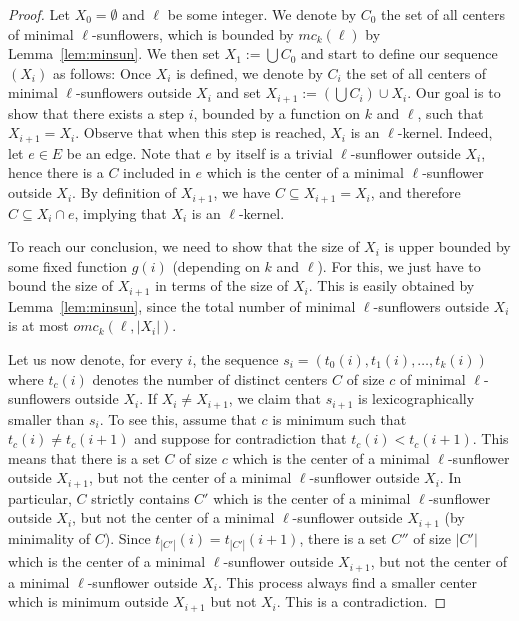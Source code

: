 \documentclass{article}
\newcommand{\hedge}{edge\xspace}
\begin{document}
\begin{proof}
Let $X_0=\emptyset$ and $\ell$ be some integer. We denote by $C_0$ the set of all centers of minimal $\ell$-sunflowers, which is bounded by $mc_k(\ell)$ by Lemma~\ref{lem:minsun}. We then set $X_1:=\bigcup C_0$ and start to define our sequence $(X_i)$ as follows: Once $X_i$ is defined, we denote by $C_i$ the set of all centers of minimal $\ell$-sunflowers outside $X_i$ and set 
$X_{i+1}:=(\bigcup C_i)\cup X_i$. Our goal is to show that there exists a step $i$, bounded by a function on $k$ and $\ell$, such that $X_{i+1}=X_i$. Observe that when this step is reached, $X_i$ is an $\ell$-kernel. Indeed, let $e\in E$ be an \hedge. Note that $e$ by itself is a trivial $\ell$-sunflower outside $X_i$, hence there is a $C$ included in $e$ which is the center of a minimal $\ell$-sunflower outside $X_i$. By definition of $X_{i+1}$, we have $C\subseteq X_{i+1}=X_i$, and therefore $C\subseteq X_i\cap e$, implying that $X_i$ is an \(\ell\)-kernel.

To reach our conclusion, we need to show that the size of $X_i$ is upper bounded by some fixed function $g(i)$ (depending on $k$ and $\ell$). For this, we just have to bound the size of $X_{i+1}$ in terms of the size of $X_i$. This is easily obtained by Lemma~\ref{lem:minsun}, since the total number of minimal $\ell$-sunflowers outside $X_i$ is at most $omc_k(\ell,|X_i|)$. 

 Let us now denote, for every $i$, the sequence $s_i=(t_0(i),t_1(i),\dots ,t_{k}(i))$ where $t_c(i)$ denotes the number of distinct centers $C$ of size $c$ of minimal $\ell$-sunflowers outside $X_i$. If $X_i\neq X_{i+1}$, we claim that $s_{i+1}$ is lexicographically smaller than $s_i$. To see this, assume that $c$ is minimum such that $t_c(i)\neq t_c(i+1)$ and suppose for contradiction that $t_c(i)<t_c(i+1)$.
This means that there is a set $C$ of size $c$ which is the center of a minimal $\ell$-sunflower outside $X_{i+1}$, but not the center of a minimal $\ell$-sunflower outside $X_{i}$. In particular, $C$ strictly contains $C'$ which is the center of a minimal $\ell$-sunflower outside $X_{i}$, but not the center of a minimal $\ell$-sunflower outside $X_{i+1}$ (by minimality of $C$). Since $t_{|C'|}(i)=t_{|C'|}(i+1)$, there is a set $C''$ of size $|C'|$ which is the center of a minimal $\ell$-sunflower outside $X_{i+1}$, but not the center of a minimal $\ell$-sunflower outside $X_{i}$. This process always find a smaller center which is minimum outside $X_{i+1}$ but not $X_i$. This is a contradiction.


\end{proof}
\end{document}
